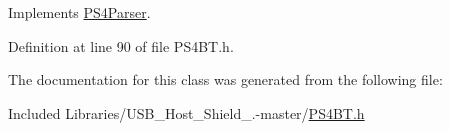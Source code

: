 \-Implements \hyperlink{class_p_s4_parser_a8788530b0c213dedfcf56b78e8ca4879}{\-P\-S4\-Parser}.



\-Definition at line 90 of file \-P\-S4\-B\-T.\-h.



\-The documentation for this class was generated from the following file\-:\begin{DoxyCompactItemize}
\item 
\-Included Libraries/\-U\-S\-B\-\_\-\-Host\-\_\-\-Shield\-\_.-\/master/\hyperlink{_p_s4_b_t_8h}{\-P\-S4\-B\-T.\-h}\end{DoxyCompactItemize}
